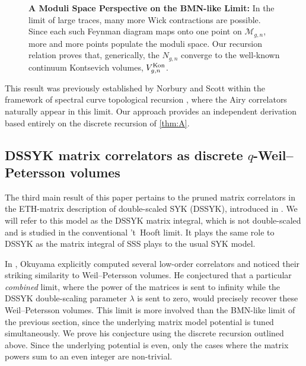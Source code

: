 \documentclass[a4paper,11pt,english]{article}
\theoremstyle{plain}
\theoremstyle{definition}
\theoremstyle{plain}
\newcommand{\M}{\mathcal{M}}
\begin{document}
\begin{figure}[t]
    \caption{\textbf{A Moduli Space Perspective on the BMN-like Limit:}  In the limit of large traces, many more Wick contractions are possible. Since each such Feynman diagram maps onto one point on $\M_{g,n}$, more and more points populate the moduli space. Our recursion relation proves that, generically, the $N_{g,n}$ converge to the well-known continuum Kontsevich volumes, $V^{\textup{Kon}}_{g,n}$.}
    \label{fig:BMN}
\end{figure}

This result was previously established by Norbury and Scott within the framework of spectral curve topological recursion \cite{NS13}, where the Airy correlators naturally appear in this limit. Our approach provides an independent derivation based entirely on the discrete recursion of \cref{thm:A}.

\subsection{DSSYK matrix correlators as discrete \texorpdfstring{$q$}{q}-Weil--Petersson volumes}
The third main result of this paper pertains to the pruned matrix correlators in the ETH-matrix description \cite{SonnerETHMatrix} of double-scaled SYK (DSSYK), introduced in \cite{JKMS23}. We will refer to this model as the DSSYK matrix integral, which is not double-scaled and is studied in the conventional 't~Hooft limit. It plays the same role to DSSYK as the matrix integral of SSS \cite{SSSJTmatrix} plays to the usual SYK model. 

In \cite{Oku23}, Okuyama explicitly computed several low-order correlators and noticed their striking similarity to Weil--Petersson volumes. He conjectured that a particular \textit{combined} limit, where the power of the matrices is sent to infinity while the DSSYK double-scaling parameter $\lambda$ is sent to zero, would precisely recover these Weil--Petersson volumes. This limit is more involved than the BMN-like limit of the previous section, since the underlying matrix model potential is tuned simultaneously. We prove his conjecture using the discrete recursion outlined above. Since the underlying potential is even, only the cases where the matrix powers sum to an even integer are non-trivial.
\end{document}
